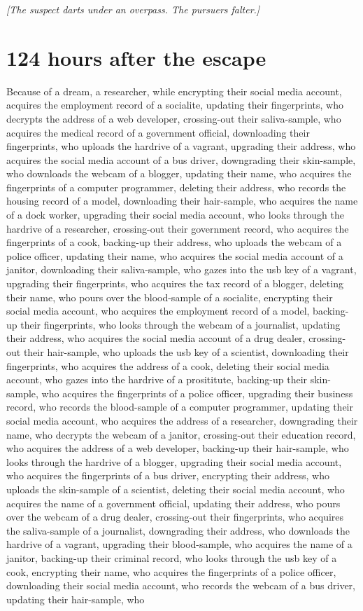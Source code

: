 \documentclass{report}
\begin{document}
\textit{[The suspect darts under an overpass. The pursuers falter.]}


\section*{124 \small{hours after the escape}}

Because of a dream, a researcher, while encrypting their social media account, acquires the employment record of a socialite, updating their fingerprints, who decrypts the address of a web developer, crossing-out their saliva-sample, who acquires the medical record of a government official, downloading their fingerprints, who uploads the hardrive of a vagrant, upgrading their address, who acquires the social media account of a bus driver, downgrading their skin-sample, who downloads the webcam of a blogger, updating their name, who acquires the fingerprints of a computer programmer, deleting their address, who records the housing record of a model, downloading their hair-sample, who acquires the name of a dock worker, upgrading their social media account, who looks through the hardrive of a researcher, crossing-out their government record, who acquires the fingerprints of a cook, backing-up their address, who uploads the webcam of a police officer, updating their name, who acquires the social media account of a janitor, downloading their saliva-sample, who gazes into the usb key of a vagrant, upgrading their fingerprints, who acquires the tax record of a blogger, deleting their name, who pours over the blood-sample of a socialite, encrypting their social media account, who acquires the employment record of a model, backing-up their fingerprints, who looks through the webcam of a journalist, updating their address, who acquires the social media account of a drug dealer, crossing-out their hair-sample, who uploads the usb key of a scientist, downloading their fingerprints, who acquires the address of a cook, deleting their social media account, who gazes into the hardrive of a prosititute, backing-up their skin-sample, who acquires the fingerprints of a police officer, upgrading their business record, who records the blood-sample of a computer programmer, updating their social media account, who acquires the address of a researcher, downgrading their name, who decrypts the webcam of a janitor, crossing-out their education record, who acquires the address of a web developer, backing-up their hair-sample, who looks through the hardrive of a blogger, upgrading their social media account, who acquires the fingerprints of a bus driver, encrypting their address, who uploads the skin-sample of a scientist, deleting their social media account, who acquires the name of a government official, updating their address, who pours over the webcam of a drug dealer, crossing-out their fingerprints, who acquires the saliva-sample of a journalist, downgrading their address, who downloads the hardrive of a vagrant, upgrading their blood-sample, who acquires the name of a janitor, backing-up their criminal record, who looks through the usb key of a cook, encrypting their name, who acquires the fingerprints of a police officer, downloading their social media account, who records the webcam of a bus driver, updating their hair-sample, who 
\end{document}
